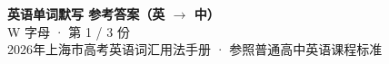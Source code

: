 \documentclass[10pt,a4paper]{article}
\begin{document}
\pagestyle{plain}

\begin{center}
{\LARGE\bfseries 英语单词默写 \quad 参考答案（英 $\to$ 中）}\\[0.22em]
{\large W 字母 · 第 1 / 3 份}\\[0.18em]
{\small 2026年上海市高考英语词汇用法手册 · 参照普通高中英语课程标准}
\end{center}

\vspace{0.2em}
\noindent{\color{rulegray}\rule{\textwidth}{0.8pt}}

\vspace{0.35em}

\vspace{0.25em}
\renewcommand{\arraystretch}{1.32}
\end{document}
